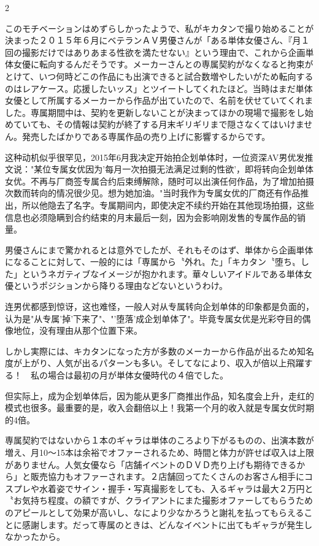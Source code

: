 \documentclass[12pt,UTF8]{ctexbook}
\begin{document}
\begin{paracol}{2}
\switchcolumn*

このモチベーションはめずらしかったようで、私がキカタンで撮り始めることが決まった２０１５年６月にベテランＡＶ男優さんが「ある単体女優さん、『月１回の撮影だけではありあまる性欲を満たせない』という理由で、これから企画単体女優に転向するんだそうです。メーカーさんとの専属契約がなくなると拘束がとけて、いつ何時どこの作品にも出演できると試合数増やしたいがため転向するのはレアケース。応援したいッス」とツイートしてくれたほど。当時はまだ単体女優として所属するメーカーから作品が出ていたので、名前を伏せていてくれました。専属期間中は、契約を更新しないことが決まってほかの現場で撮影をし始めていても、その情報は契約が終了する月末ギリギリまで隠さなくてはいけません。発売したばかりである専属作品の売り上げに影響するからです。

\switchcolumn

这种动机似乎很罕见，2015年6月我决定开始拍企划单体时，一位资深AV男优发推文说："某位专属女优因为'每月一次拍摄无法满足过剩的性欲'，即将转向企划单体女优。不再与厂商签专属合约后束缚解除，随时可以出演任何作品，为了增加拍摄次数而转向的情况很少见。想为她加油。"当时我作为专属女优的厂商还有作品推出，所以他隐去了名字。专属期间内，即使决定不续约开始在其他现场拍摄，这些信息也必须隐瞒到合约结束的月末最后一刻，因为会影响刚发售的专属作品的销量。

\switchcolumn*
男優さんにまで驚かれるとは意外でしたが、それもそのはず、単体から企画単体になることに対して、一般的には「専属から〝外れ〟た」「キカタン〝堕ち〟した」というネガティブなイメージが抱かれます。華々しいアイドルである単体女優というポジションから降りる理由などないというわけ。

\switchcolumn

连男优都感到惊讶，这也难怪，一般人对从专属转向企划单体的印象都是负面的，认为是"从专属'掉'下来了"、"'堕落'成企划单体了"。毕竟专属女优是光彩夺目的偶像地位，没有理由从那个位置下来。

\switchcolumn*

しかし実際には、キカタンになった方が多数のメーカーから作品が出るため知名度が上がり、人気が出るパターンも多い。そしてなにより、収入が倍以上飛躍する！　私の場合は最初の月が単体女優時代の４倍でした。

\switchcolumn

但实际上，成为企划单体后，因为能从更多厂商推出作品，知名度会上升，走红的模式也很多。最重要的是，收入会翻倍以上！我第一个月的收入就是专属女优时期的4倍。

\switchcolumn*

専属契約ではないから１本のギャラは単体のころより下がるものの、出演本数が増え、月10〜15本は余裕でオファーされるため、時間と体力が許せば収入は上限がありません。人気女優なら「店舗イベントのＤＶＤ売り上げも期待できるから」と販売協力もオファーされます。２店舗回ってたくさんのお客さん相手にコスプレや水着姿でサイン・握手・写真撮影をしても、入るギャラは最大２万円と〝お気持ち程度〟の額ですが、クライアントにまた撮影オファーしてもらうためのアピールとして効果が高いし、なにより少なかろうと謝礼を払ってもらえることに感謝します。だって専属のときは、どんなイベントに出てもギャラが発生しなかったから。


\end{paracol}
\end{document}
